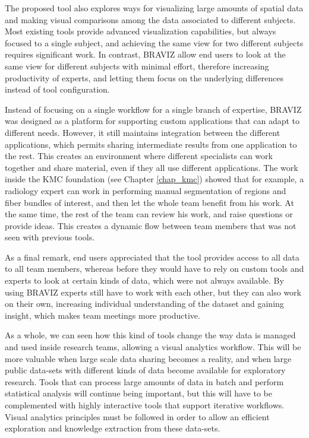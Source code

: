 {The proposed tool also explores ways for visualizing large amounts of spatial data and making visual comparisons among the data associated to different subjects. Most existing tools provide advanced visualization capabilities, but always focused to a single subject, and achieving the same view for two different subjects requires significant work. In contrast, BRAVIZ allow end users to look at the same view for different subjects with minimal effort, therefore increasing productivity of experts, and letting them focus on the underlying differences instead of tool configuration. 

Instead of focusing on a single workflow for a single branch of expertise, BRAVIZ was designed as a platform for supporting custom applications that can adapt to different needs. However, it still maintains integration between the different applications, which permits sharing intermediate results from one application to the rest. This creates an environment where different specialists can work together and share material, even if they all use different applications. The work inside the KMC foundation (see Chapter \ref{chap_kmc}) showed that for example, a radiology expert can work in performing manual segmentation of regions and fiber bundles of interest, and then let the whole team benefit from his work. At the same time, the rest of the team can review his work, and raise questions or provide ideas. This creates a dynamic flow between team members that was not seen with previous tools.

As a final remark, end users appreciated that the tool provides access to all data to all team members, whereas before they would have to rely on custom tools and experts to look at certain kinds of data, which were not always available. By using BRAVIZ experts still have to work with each other, but they can also work on their own, increasing individual understanding of the dataset and gaining insight, which makes team meetings more productive. 

As a whole, we can seen how this kind of tools change the way data is managed and used inside research teams, allowing a visual analytics workflow. This will be more valuable when large scale data sharing becomes a reality, and when large public data-sets with different kinds of data become available for exploratory research. Tools that can process large amounts of data in batch and perform statistical analysis will continue being important, but this will have to be complemented with highly interactive tools that support iterative workflows. Visual analytics principles must be followed in order to allow an efficient exploration and knowledge extraction from these data-sets.

}
